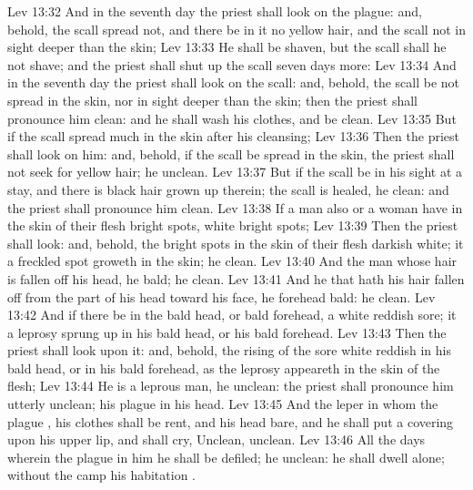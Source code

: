\vs Lev 13:32 And in the seventh day the priest shall look on the plague: and, behold,  the scall spread not, and there be in it no yellow hair, and the scall  not in sight deeper than the skin;
\vs Lev 13:33 He shall be shaven, but the scall shall he not shave; and the priest shall shut up  the scall seven days more:
\vs Lev 13:34 And in the seventh day the priest shall look on the scall: and, behold,  the scall be not spread in the skin, nor  in sight deeper than the skin; then the priest shall pronounce him clean: and he shall wash his clothes, and be clean.
\vs Lev 13:35 But if the scall spread much in the skin after his cleansing;
\vs Lev 13:36 Then the priest shall look on him: and, behold, if the scall be spread in the skin, the priest shall not seek for yellow hair; he  unclean.
\vs Lev 13:37 But if the scall be in his sight at a stay, and  there is black hair grown up therein; the scall is healed, he  clean: and the priest shall pronounce him clean.
\vs Lev 13:38 If a man also or a woman have in the skin of their flesh bright spots,  white bright spots;
\vs Lev 13:39 Then the priest shall look: and, behold,  the bright spots in the skin of their flesh  darkish white; it  a freckled spot  groweth in the skin; he  clean.
\vs Lev 13:40 And the man whose hair is fallen off his head, he  bald;  he clean.
\vs Lev 13:41 And he that hath his hair fallen off from the part of his head toward his face, he  forehead bald:  he clean.
\vs Lev 13:42 And if there be in the bald head, or bald forehead, a white reddish sore; it  a leprosy sprung up in his bald head, or his bald forehead.
\vs Lev 13:43 Then the priest shall look upon it: and, behold,  the rising of the sore  white reddish in his bald head, or in his bald forehead, as the leprosy appeareth in the skin of the flesh;
\vs Lev 13:44 He is a leprous man, he  unclean: the priest shall pronounce him utterly unclean; his plague  in his head.
\vs Lev 13:45 And the leper in whom the plague , his clothes shall be rent, and his head bare, and he shall put a covering upon his upper lip, and shall cry, Unclean, unclean.
\vs Lev 13:46 All the days wherein the plague  in him he shall be defiled; he  unclean: he shall dwell alone; without the camp  his habitation .

